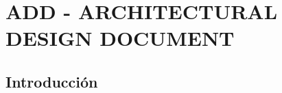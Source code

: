 \chapter{\textcolor[gray]{.2}{ADD - ARCHITECTURAL DESIGN DOCUMENT}}
%

\newpage
\section{\textcolor[gray]{.2}{Introducción}}
